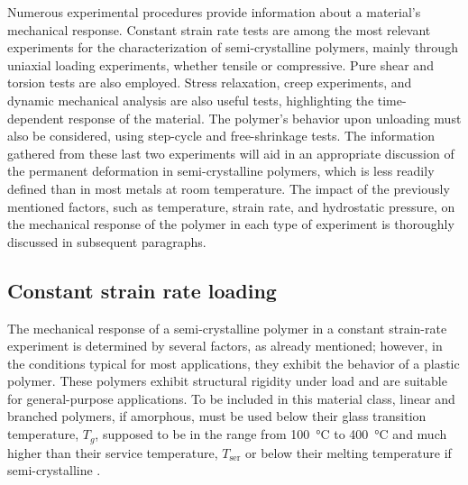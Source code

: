 Numerous experimental procedures provide information about a material's mechanical response.
Constant strain rate tests are among the most relevant experiments for the characterization of semi-crystalline polymers, mainly through uniaxial loading experiments, whether tensile or compressive.
Pure shear and torsion tests are also employed.
Stress relaxation, creep experiments, and dynamic mechanical analysis are also useful tests, highlighting the time-dependent response of the material.
The polymer's behavior upon unloading must also be considered, using step-cycle and free-shrinkage tests.
The information gathered from these last two experiments will aid in an appropriate discussion of the permanent deformation in semi-crystalline polymers, which is less readily defined than in most metals at room temperature.
The impact of the previously mentioned factors, such as temperature, strain rate, and hydrostatic pressure, on the mechanical response of the polymer in each type of experiment is thoroughly discussed in subsequent paragraphs.

\subsection{Constant strain rate loading}

The mechanical response of a semi-crystalline polymer in a constant strain-rate experiment is determined by several factors, as already mentioned; however, in the conditions typical for most applications, they exhibit the behavior of a plastic polymer.
These polymers exhibit structural rigidity under load and are suitable for general-purpose applications.
To be included in this material class, linear and branched polymers, if amorphous, must be used below their glass transition temperature, $T_g$, supposed to be in the range from \SI{100}{\celsius} to \SI{400}{\celsius} and much higher than their service temperature, $T_\mathrm{ser}$ or below their melting temperature if semi-crystalline \citep{callister2014materials, arzhakovRelaxationPhysicalMechanical2019}.


